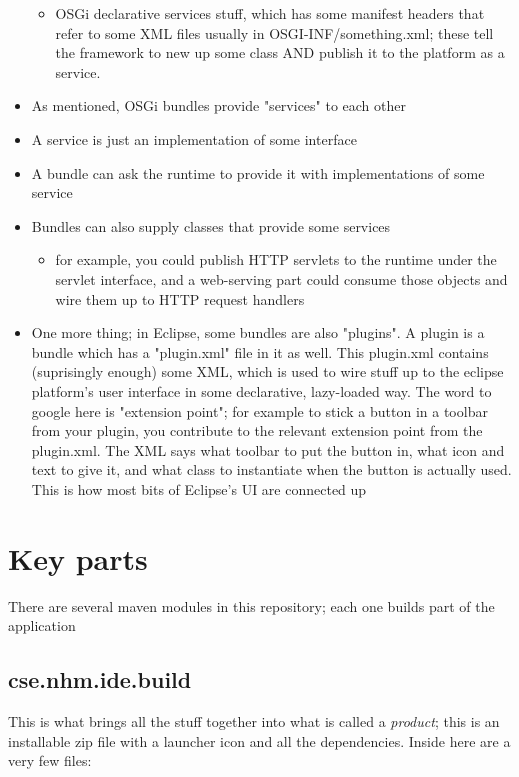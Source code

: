 \documentclass[11pt]{article}
\begin{document}
\begin{itemize}
\begin{itemize}
\item OSGi declarative services stuff, which has some manifest headers that refer to some XML files usually in OSGI-INF/something.xml; these tell the framework to new up some class AND publish it to the platform as a service.
\end{itemize}
\item As mentioned, OSGi bundles provide "services" to each other
\item A service is just an implementation of some interface
\item A bundle can ask the runtime to provide it with implementations of some service
\item Bundles can also supply classes that provide some services
\begin{itemize}
\item for example, you could publish HTTP servlets to the runtime under the servlet interface, and a web-serving part could consume those objects and wire them up to HTTP request handlers
\end{itemize}
\item One more thing; in Eclipse, some bundles are also "plugins". A plugin is a bundle which has a "plugin.xml" file in it as well. This plugin.xml contains (suprisingly enough) some XML, which is used to wire stuff up to the eclipse platform's user interface in some declarative, lazy-loaded way. The word to google here is "extension point"; for example to stick a button in a toolbar from your plugin, you contribute to the relevant extension point from the plugin.xml. The XML says what toolbar to put the button in, what icon and text to give it, and what class to instantiate when the button is actually used. This is how most bits of Eclipse's UI are connected up
\end{itemize}

\section{Key parts}
\label{sec-1}

There are several maven modules in this repository; each one builds part of the application

\subsection{cse.nhm.ide.build}
\label{sec-1-1}

This is what brings all the stuff together into what is called a \emph{product}; this is an installable zip file with a launcher icon and all the dependencies. Inside here are a very few files:
\end{document}
